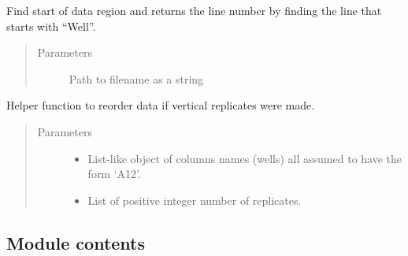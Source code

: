 \documentclass[letterpaper,10pt,english]{sphinxmanual}
\begin{document}

\begin{fulllineitems}
\label{\detokenize{platelib:platelib.plateread.search_start}}
Find start of data region and returns the line number by finding the line that starts with “Well”.
\begin{quote}\begin{description}
\item[{Parameters}] \leavevmode
{} \textendash{} Path to filename as a string

\end{description}\end{quote}

\end{fulllineitems}


\begin{fulllineitems}
\label{\detokenize{platelib:platelib.plateread.vert_order}}
Helper function to reorder data if vertical replicates were made.
\begin{quote}\begin{description}
\item[{Parameters}] \leavevmode\begin{itemize}
\item {} 
 \textendash{} List-like object of columns names (wells) all assumed to have the form ‘A12’.

\item {} 
 \textendash{} List of positive integer number of replicates.

\end{itemize}

\end{description}\end{quote}

\end{fulllineitems}



\subsection{Module contents}
\label{\detokenize{platelib:module-contents}}\label{\detokenize{platelib:module-platelib}}
\end{document}
